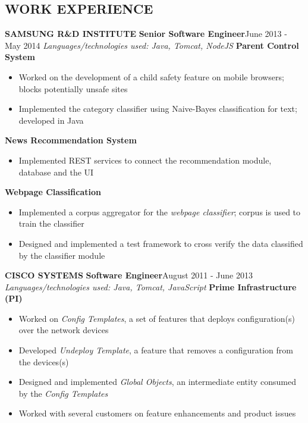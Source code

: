 \documentclass[11pt, letterpaper]{article}
\begin{document}
\begin{multicols}{2}
		\section*{WORK EXPERIENCE}
			\vspace{0.2cm}
			{\bfseries SAMSUNG R\&D INSTITUTE}\newline
			{\bfseries \small Senior Software Engineer}\hfill{June 2013 - May 2014}\newline
				\textit{Languages/technologies used: Java, Tomcat, NodeJS}\newline
				{\bfseries Parent Control System}
				\begin{itemize}[nolistsep,leftmargin=*]
					\item Worked on the development of a child safety feature on mobile browsers; blocks potentially unsafe sites
					\item Implemented the category classifier using Naive-Bayes classification for text; developed in Java
				\end{itemize}
				{\bfseries News Recommendation System}
				\begin{itemize}[nolistsep,leftmargin=*]
					\item Implemented REST services to connect the recommendation module, database and the UI
				\end{itemize}
				{\bfseries Webpage Classification}
				\begin{itemize}[nolistsep,leftmargin=*]
					\item Implemented a corpus aggregator for the \textit{webpage classifier}; corpus is used to train the classifier
					\item Designed and implemented a test framework to cross verify the data classified by the classifier module
				\end{itemize}
			\vspace{0.3cm}


			{\bfseries CISCO SYSTEMS}\newline
			{\bfseries \small Software Engineer}\hfill{August 2011 - June 2013}\newline			
				\textit{Languages/technologies used: Java, Tomcat, JavaScript}\newline
				{\bfseries Prime Infrastructure (PI)}
				\begin{itemize}[nolistsep,leftmargin=*]
					\item Worked on \textit{Config Templates}, a set of features that deploys configuration(s) over the network devices
					\item Developed \textit{Undeploy Template}, a feature that removes a configuration from the devices(s)
					\item Designed and implemented \textit{Global Objects}, an intermediate entity consumed by the \textit{Config Templates}
					\item Worked with several customers on feature enhancements and product issues
				\end{itemize}
			\vspace{0.3cm}
				

\end{multicols}
\end{document}
